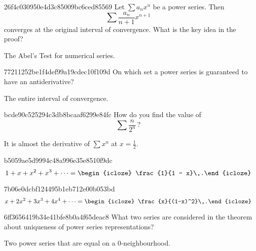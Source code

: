 \begin{note}{26f4c030950e4d3c85009bc6ced85569}
    Let \({ \sum a_n x^{n} }\) be a power series.
    Then
    \[
        \sum \frac{a_n}{n+1}x^{n+1}
    \]
    converges at the original interval of convergence.
    What is the key idea in the proof?

    \begin{cloze}{1}
        The Abel's Test for numerical series.
    \end{cloze}
\end{note}

\begin{note}{77211252be1f4def99a19cdec10f109d}
    On which set a power series is guaranteed to have an antiderivative?

    \begin{cloze}{1}
        The entire interval of convergence.
    \end{cloze}
\end{note}

\begin{note}{bcde90c525294c3db8bcaaf6299e84fc}
    How do you find the value of
    \[
        \sum \frac{n}{2^{n}}\,?
    \]

    \begin{cloze}{1}
        It is almost the derivative of \({ \sum x^{n} }\) at \({ x = \frac{1}{2} }\).
    \end{cloze}
\end{note}

\begin{note}{b5059ae5d9994c48a996e35e8510f9dc}
    \[
        1 + x + x^2 + x^3 + \cdots = \begin{icloze}{1}\frac{1}{1 - x}\,.\end{icloze}
    \]
\end{note}

\begin{note}{7b06e0dcbf124495b1eb712e00b053bd}
    \[
        x + 2x^2 + 3x^3 + 4x^4 + \cdots = \begin{icloze}{1}\frac{x}{(1-x)^2}\,.\end{icloze}
    \]
\end{note}

\begin{note}{6ff3656419b34e41bfe8b0a4f65deac8}
    What two series are considered in the theorem about uniqueness of power series representations?

    \begin{cloze}{1}
        Two power series that are equal on a \({ 0 }\)-neighbourhood.
    \end{cloze}
\end{note}


